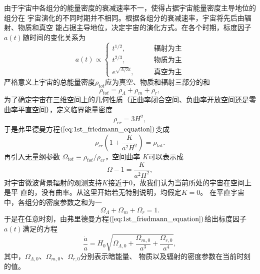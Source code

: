 由于宇宙中各组分的能量密度的衰减速率不一，使得占据宇宙能量密度主导地位的组分在
宇宙演化的不同时期并不相同。根据各组分的衰减速率，宇宙将先后由辐射、物质和真空
能占据主导地位，决定宇宙的演化方式。在各个时期，标度因子$a(t)$随时间的变化关系为
\begin{equation}
    a(t)\propto 
    \begin{cases}
      t^{1/2},\qquad &\text{辐射为主}\\
      t^{2/3},\qquad &\text{物质为主}\\
      e^{\sqrt{\Lambda/3}t},\qquad &\text{真空为主}
    \end{cases}
\end{equation}
严格意义上宇宙的总能量密度$\rho_{tot}$应为真空、物质和辐射三部分的和
\begin{equation}
    \rho_{tot} = \rho_{\Lambda}+\rho_m+\rho_r,
\end{equation}
为了确定宇宙在三维空间上的几何性质（正曲率闭合空间、负曲率开放空间还是零曲率平直空间），定义临界能量密度 
\begin{equation}
    \label{eq:critical_rho}
    \rho_{cr} = 3H^2,
\end{equation}
于是弗里德曼方程$(\ref{eq:1st_friedmann_equation})$变成
\begin{equation}
    \rho_{cr}\left(1 + \frac{K}{a^2H^2}\right) = \rho_{tot}.
\end{equation}
再引入无量纲参数 $\Omega_{tot}\equiv
\rho_{tot}/\rho_{cr}$，空间曲率 $K$可以表示成
\begin{equation}\label{eq:flatness}
    \Omega - 1 = \frac{K}{a^2H^2} ,
\end{equation}
对宇宙微波背景辐射的观测支持$K$接近于$0$，故我们认为当前所处的宇宙在空间上是平
直的，没有曲率。从这里开始若无特别说明，均假定$K=0$。
在平直宇宙中，各组分的密度参数之和为一
\begin{equation}
    \Omega_{\Lambda}+\Omega_m+\Omega_r=1.
\end{equation}
于是在任意时刻，由弗里德曼方程$(\ref{eq:1st_friedmann_equation})$给出标度因子$a(t)$满足的方程
\begin{equation}
    \frac{\dot{a}}{a} =
    H_0\sqrt{\Omega_{\Lambda,0}+\frac{\Omega_{m,0}}{a^3}+\frac{\Omega_{r,0}}{a^4}},
\end{equation}
其中，$\Omega_{\Lambda,0}$、$\Omega_{m,0}$、$\Omega_{r,0}$分别表示暗能量、
物质以及辐射的密度参数在当前时刻的值。
